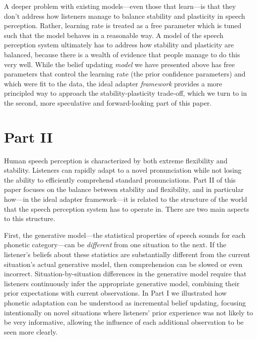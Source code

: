 A deeper problem with existing models---even those that learn---is that they don't address how listeners manage to balance stability and plasticity in speech perception.  Rather, learning rate is treated as a free parameter which is tuned such that the model behaves in a reasonable way.  A model of the speech perception system ultimately has to address how stability and plasticity are balanced, because there is a wealth of evidence that people manage to do this very well.  While the belief updating \emph{model} we have presented above has free parameters that control the learning rate (the prior confidence parameters) and which were fit to the data, the ideal adapter \emph{framework} provides a more principled way to approach the stability-plasticity trade-off, which we turn to in the second, more speculative and forward-looking part of this paper.  





\section{Part II}
\label{sec:part-ii}

Human speech perception is characterized by both extreme flexibility and stability.  Listeners can rapidly adapt to a novel pronunciation while not losing the ability to efficiently comprehend standard pronunciations.  Part II of this paper focuses on the balance between stability and flexibility, and in particular how---in the ideal adapter framework---it is related to the structure of the world that the speech perception system has to operate in.  There are two main aspects to this structure.  

First, the generative model---the statistical properties of speech sounds for each phonetic category---can be \emph{different} from one situation to the next.  If the listener's beliefs about these statistics are substantially different from the current situation's actual generative model, then comprehension can be slowed or even incorrect.  Situation-by-situation differences in the generative model require that listeners continuously infer the appropriate generative model, combining their prior expectations with current observations. 
In Part I we illustrated how phonetic adaptation can be understood as incremental belief updating, focusing intentionally on novel situations where listeners' prior experience was not likely to be very informative, allowing the influence of each additional observation to be seen more clearly. 

